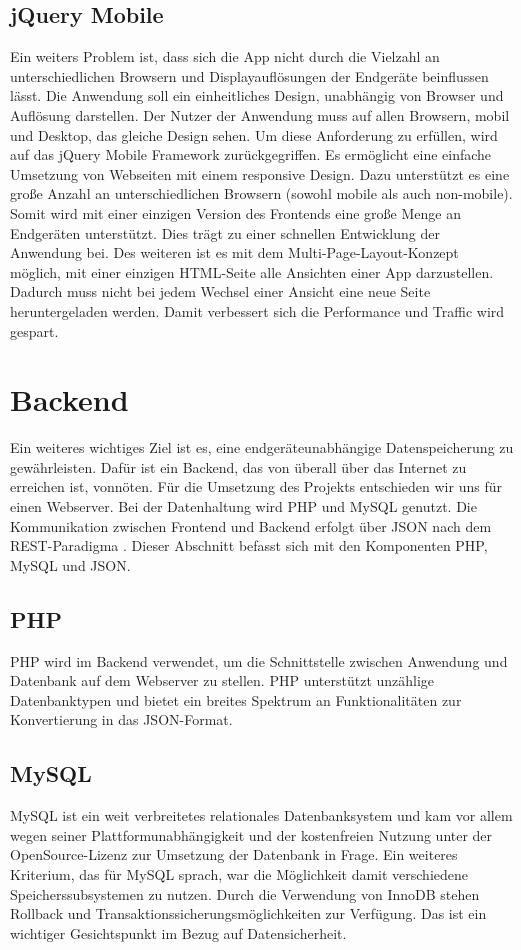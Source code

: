 \documentclass[10pt, conference, compsocconf]{IEEEtran}
\begin{document}
\subsection{jQuery Mobile}
Ein weiters Problem ist, dass sich die App nicht durch die Vielzahl an unterschiedlichen Browsern und Displayaufl\"osungen der Endger\"ate beinflussen l\"asst. 
Die Anwendung soll ein einheitliches Design, unabh\"angig von Browser und Aufl\"osung darstellen. 
Der Nutzer der Anwendung muss auf allen Browsern, mobil und Desktop, das gleiche Design sehen.
Um diese Anforderung zu erf\"ullen, wird auf das jQuery Mobile Framework zur\"uckgegriffen.
Es erm\"oglicht eine einfache Umsetzung von Webseiten mit einem responsive Design. Dazu unterst\"utzt es eine große Anzahl an unterschiedlichen Browsern (sowohl mobile als auch non-mobile). \cite{jQueryStart}
Somit wird mit einer einzigen Version des Frontends eine gro{\ss}e Menge an Endger\"aten unterst\"utzt. Dies tr\"agt zu einer schnellen Entwicklung der Anwendung bei. 
Des weiteren ist es mit dem Multi-Page-Layout-Konzept m\"oglich, mit einer einzigen HTML-Seite alle Ansichten einer App darzustellen. 
Dadurch muss nicht bei jedem Wechsel einer Ansicht eine neue Seite heruntergeladen werden. Damit verbessert sich die Performance und Traffic wird gespart. \cite{jQueryDemo}

\section{Backend}
Ein weiteres wichtiges Ziel ist es, eine endger\"ateunabh\"angige Datenspeicherung zu gew\"ahrleisten. 
Daf\"ur ist ein Backend, das von \"uberall \"uber das Internet zu erreichen ist, vonn\"oten. 
F\"ur die Umsetzung des Projekts entschieden wir uns f\"ur einen Webserver. Bei der Datenhaltung wird PHP und MySQL genutzt. 
Die Kommunikation zwischen Frontend  und Backend erfolgt über JSON nach dem REST-Paradigma .  
Dieser Abschnitt befasst sich mit den Komponenten PHP, MySQL und JSON.

\subsection{PHP}
PHP wird im Backend verwendet, um die Schnittstelle zwischen Anwendung und Datenbank auf dem Webserver zu stellen. PHP unterst\"utzt unz\"ahlige Datenbanktypen und bietet ein breites Spektrum an Funktionalit\"aten zur Konvertierung in das JSON-Format.

\subsection{MySQL}
MySQL ist ein weit verbreitetes relationales Datenbanksystem und kam vor allem wegen seiner Platt\-formunabh\"angigkeit und der kostenfreien Nutzung unter der OpenSource-Lizenz zur Umsetzung der Datenbank in Frage. 
Ein weiteres Kriterium, das für MySQL sprach, war die M\"oglichkeit damit verschiedene Speicherssubsystemen zu nutzen. 
Durch die Verwendung von InnoDB stehen Rollback und Transaktionssicherungsm\"oglichkeiten zur Verf\"ugung. \cite{InnoDB}
Das ist ein wichtiger Gesichtspunkt im Bezug auf Datensicherheit.
\end{document}
